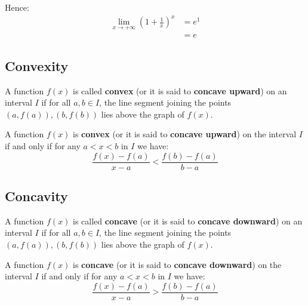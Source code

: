\documentclass[11pt]{article}
\begin{document}
Hence:
\begin{align*}
\lim_{x \rightarrow +\infty} \left(1 + \frac{1}{x} \right)^{x} &= e^{1} \\
&= e
\end{align*}

\newpage

\subsection{Convexity}
\label{sec:org7cf7896}
A function \(f(x)\) is called \textbf{convex} (or it is said to \textbf{concave upward}) on an interval \(I\) if for all \(a, b \in I\), the line segment joining the points \((a, f(a)), (b, f(b))\) lies above the graph of \(f(x)\).
\\[0pt]

\begin{center}
\end{center}

A function \(f(x)\) is \textbf{convex} (or it is said to \textbf{concave upward}) on the interval \(I\) if and only if for any \(a < x < b\) in \(I\) we have:
\[\frac{f(x) - f(a)}{x - a} < \frac{f(b) - f(a)}{b - a}\]

\newpage

\subsection{Concavity}
\label{sec:org0f122a7}
A function \(f(x)\) is called \textbf{concave} (or it is said to \textbf{concave downward}) on an interval \(I\) if for all \(a, b \in I\), the line segment joining the points \((a, f(a)), (b, f(b))\) lies above the graph of \(f(x)\).
\\[0pt]

\begin{center}
\end{center}

A function \(f(x)\) is \textbf{concave} (or it is said to \textbf{concave downward}) on the interval \(I\) if and only if for any \(a < x < b\) in \(I\) we have:
\[\frac{f(x) - f(a)}{x - a} > \frac{f(b) - f(a)}{b - a}\]
\end{document}
